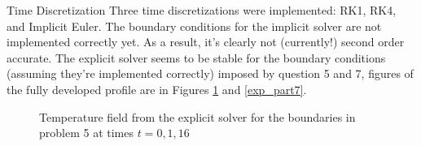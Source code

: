 \documentclass{article}
\begin{document}
\begin{section}{Time Discretization}
Three time discretizations were implemented: RK1, RK4, and Implicit Euler.
The boundary conditions for the implicit solver are not implemented correctly yet.
As a result, it's clearly not (currently!) second order accurate.
The explicit solver seems to be stable for the boundary conditions
(assuming they're implemented correctly) imposed by question 5 and 7,
figures of the fully developed profile are in Figures \ref{exp_part5} and \ref{exp_part7}.

\begin{figure}[ht]
  \caption{Temperature field from the explicit solver for the boundaries in problem 5 at times $t = 0, 1, 16$}
  \label{exp_part5}
\end{figure}


\end{section}
\end{document}
